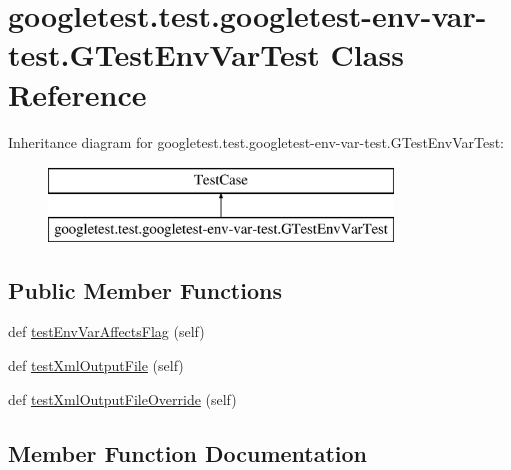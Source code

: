 \hypertarget{classgoogletest_1_1test_1_1googletest-env-var-test_1_1_g_test_env_var_test}{}\section{googletest.\+test.\+googletest-\/env-\/var-\/test.G\+Test\+Env\+Var\+Test Class Reference}
\label{classgoogletest_1_1test_1_1googletest-env-var-test_1_1_g_test_env_var_test}
Inheritance diagram for googletest.\+test.\+googletest-\/env-\/var-\/test.G\+Test\+Env\+Var\+Test\+:\begin{figure}[H]
\begin{center}
\leavevmode
\includegraphics[height=2.000000cm]{d4/d36/classgoogletest_1_1test_1_1googletest-env-var-test_1_1_g_test_env_var_test}
\end{center}
\end{figure}
\subsection*{Public Member Functions}
\begin{DoxyCompactItemize}
\item 
def \mbox{\hyperlink{classgoogletest_1_1test_1_1googletest-env-var-test_1_1_g_test_env_var_test_a1839518615fc778ab0cd1583bd28e6a1}{test\+Env\+Var\+Affects\+Flag}} (self)
\item 
def \mbox{\hyperlink{classgoogletest_1_1test_1_1googletest-env-var-test_1_1_g_test_env_var_test_a854f9699912c9b79197837772b281008}{test\+Xml\+Output\+File}} (self)
\item 
def \mbox{\hyperlink{classgoogletest_1_1test_1_1googletest-env-var-test_1_1_g_test_env_var_test_a32b1084cf330a5954a2b9f99e3519db2}{test\+Xml\+Output\+File\+Override}} (self)
\end{DoxyCompactItemize}


\subsection{Member Function Documentation}
\mbox{\label{classgoogletest_1_1test_1_1googletest-env-var-test_1_1_g_test_env_var_test_a1839518615fc778ab0cd1583bd28e6a1}} 
